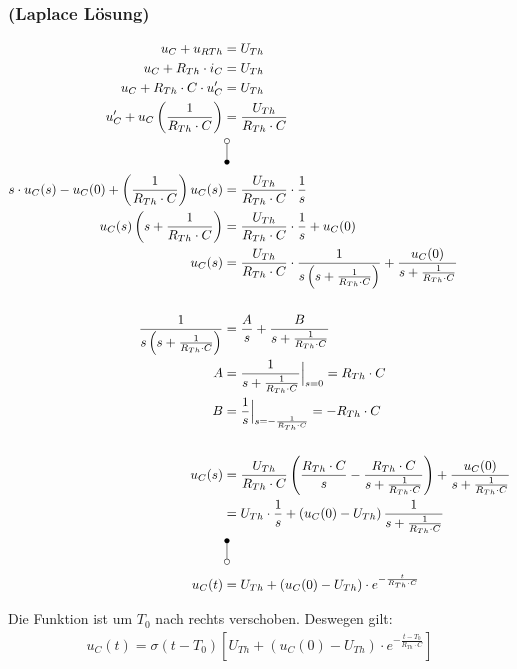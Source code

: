 \documentclass[11pt]{scrartcl}
\newcommand{\vlaplace}[1][]{\mbox{\setlength{\unitlength}{0.1em}%
    \begin{picture}(10,20)%
      \put(3,2){\circle{4}}%
      \put(3,4){\line(0,1){12}}%
      \put(3,18){\circle*{4}}%
      \put(10,7){#1}
    \end{picture}%
  }%
}%
\newcommand{\vLaplace}[1][]{\mbox{\setlength{\unitlength}{0.1em}%
    \begin{picture}(10,20)%
      \put(3,2){\circle*{4}}%
      \put(3,4){\line(0,1){12}}%
      \put(3,18){\circle{4}}%
      \put(10,7){#1}
    \end{picture}%
  }%
}%
\begin{document}
\subsubsection{(Laplace Lösung)}
\setlength{\jot}{12pt}
\begin{align*}
  u_C + u_{RTh} &= U_{Th} \\
  u_C + R_{Th} \cdot i_C &= U_{Th} \\
  u_C + R_{Th} \cdot C \cdot u_C^{\prime} &= U_{Th} \\
  u_C^{\prime} + u_C \left( \frac{1}{R_{Th} \cdot C}\right) &= \frac{U_{Th}}{R_{Th} \cdot C} \\
                &\vLaplace \\
  s \cdot u_C(s) - u_C (0) + \left( \frac{1}{R_{Th} \cdot C} \right) u_C(s) &= \frac{U_{Th}}{R_{Th} \cdot C} \cdot \frac{1}{s} \\
  u_C(s) \left(s + \frac{1}{R_{Th} \cdot C}\right) &= \frac{U_{Th}}{R_{Th} \cdot C} \cdot \frac{1}{s} + u_C(0) \\
  u_C(s) &= \frac{U_{Th}}{R_{Th} \cdot C} \cdot\frac{1}{s \left( s + \frac{1}{R_{Th} \cdot C} \right)} + \frac{u_C(0)}{s + \frac{1}{R_{Th} \cdot C}} \\ \\
  \frac{1}{s\left(s + \frac{1}{R_{Th} \cdot C} \right)} &= \frac{A}{s} + \frac{B}{s + \frac{1}{R_{Th}\cdot C}} \\
  A &= \frac{1}{s + \frac{1}{R_{Th} \cdot C}} \Big|_{s=0} = R_{Th} \cdot C \\
  B &= \frac{1}{s} \Big|_{s=-\frac{1}{R_{Th} \cdot C}} = - R_{Th} \cdot C \\ \\
  u_C(s) &= \frac{U_{Th}}{R_{Th} \cdot C} \left( \frac{R_{Th} \cdot C}{s} - \frac{R_{Th} \cdot C}{s + \frac{1}{R_{Th} \cdot C}}\right) + \frac{u_C(0)}{s + \frac{1}{R_{Th} \cdot C}} \\
                &= U_{Th} \cdot \frac{1}{s} + \left( u_C(0) - U_{Th} \right) \frac{1}{s + \frac{1}{R_{Th} \cdot C}} \\
                &\vlaplace \\
  u_C(t) &= U_{Th} + (u_C(0) - U_{Th}) \cdot e^{-\frac{t}{R_{Th} \cdot C}} \\
\end{align*}

Die Funktion ist um $T_0$ nach rechts verschoben. Deswegen gilt:
\begin{align*}
  u_C(t) = \sigma(t-T_0) \left[ U_{Th} + (u_C(0) - U_{Th}) \cdot e^{-\frac{t-T_0}{R_{Th} \cdot C}} \right]
\end{align*}
\end{document}
